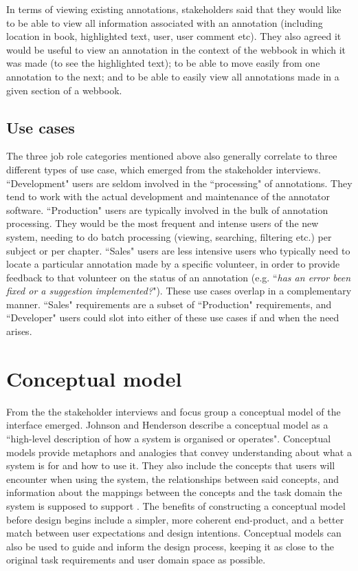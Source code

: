 In terms of viewing existing annotations, stakeholders said that they would like to be able to view all information associated with an annotation (including location in book, highlighted text, user, user comment etc). They also agreed it would be useful to view an annotation in the context of the webbook in which it was made (to see the highlighted text); to be able to move easily from one annotation to the next; and to be able to easily view all annotations made in a given section of a webbook.

\subsection{Use cases}
The three job role categories mentioned above also generally correlate to three different types of use case, which emerged from the stakeholder interviews. ``Development" users are seldom involved in the ``processing" of annotations. They tend to work with the actual development and maintenance of the annotator software. ``Production" users are typically involved in the bulk of annotation processing. They would be the most frequent and intense users of the new system, needing to do batch processing (viewing, searching, filtering etc.) per subject or per chapter. ``Sales" users are less intensive users who typically need to locate a particular annotation made  by a specific volunteer, in order to provide feedback to that volunteer on the status of an annotation (e.g. ``\textit{has an error been fixed or a suggestion implemented?}"). These use cases overlap in a complementary manner. ``Sales" requirements are a subset of ``Production" requirements, and ``Developer" users could slot into either of these use cases if and when the need arises. 

\section{Conceptual model}
From the the stakeholder interviews and focus group a conceptual model of the interface emerged. Johnson and Henderson \citep[p. 27]{Johnson} describe a conceptual model as a ``high-level description of how a system is organised or operates". Conceptual models provide metaphors and analogies that convey understanding about what a system is for and how to use it. They also include the concepts that users will encounter when using the system, the relationships between said concepts, and information about the mappings between the concepts and the task domain the system is supposed to support \citep[p. 40-41]{RogersPreece}.  The benefits of constructing a conceptual model before design begins include a simpler, more coherent end-product, and a better match between user expectations and design intentions\citep[p. 26]{Johnson}. Conceptual models can also be used to guide and inform the design process, keeping it as close to the original task requirements and user domain space as possible\citep[p. 40]{RogersPreece}. 

